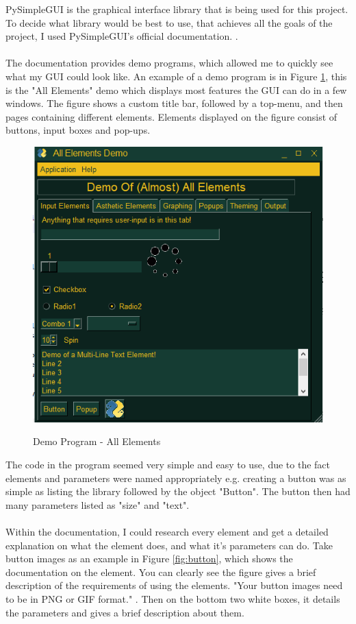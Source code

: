 \documentclass[final]{cmpreport}
\begin{document}
	PySimpleGUI is the graphical interface library that is being used for this project. To decide what library would be best to use, that achieves all the goals of the project, I used PySimpleGUI's official documentation. \cite{py}.\\
	\\The documentation provides demo programs, which allowed me to quickly see what my GUI could look like. An example of a demo program is in Figure \ref{fig:demo}, this is the "All Elements" demo which displays most features the GUI can do in a few windows. The figure shows a custom title bar, followed by a top-menu, and then pages containing different elements. Elements displayed on the figure consist of buttons, input boxes and pop-ups.
	\begin{figure}[H]
		\caption{Demo Program - All Elements}
		\centering
		\includegraphics[scale=0.6]{demoprogram.png}
		\label{fig:demo}
	\end{figure}
	The code in the program seemed very simple and easy to use, due to the fact elements and parameters were named appropriately e.g. creating a button was as simple as listing the library followed by the object "Button". The button then had many parameters listed as "size" and "text".\\ 
	\\Within the documentation, I could research every element and get a detailed explanation on what the element does, and what it's parameters can do. Take button images as an example in Figure \ref{fig:button}, which shows the documentation on the element. You can clearly see the figure gives a brief description of the requirements of using the elements. "Your button images need to be in PNG or GIF format." \cite{py}. Then on the bottom two white boxes, it details the parameters and gives a brief description about them. 
\end{document}
